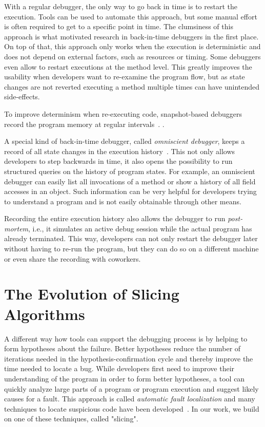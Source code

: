 With a regular debugger, the only way to go back in time is to restart the execution.
Tools can be used to automate this approach, but some manual effort is often required to get to a specific point in time.
The clumsiness of this approach is what motivated research in back-in-time debuggers in the first place.
On top of that, this approach only works when the execution is deterministic and does not depend on external factors, such as resources or timing.
Some debuggers even allow to restart executions at the method level.
This greatly improves the usability when developers want to re-examine the program flow, but as state changes are not reverted executing a method multiple times can have unintended side-effects.

To improve determinism when re-executing code, snapshot-based debuggers record the program memory at regular intervals~\cite{feldman88:igor_a_system}.
\cite{boothe00:efficient_algorithms_for_bidirectional}.

A special kind of back-in-time debugger, called \emph{omniscient debugger}, keeps a record of all state changes in the execution history~\cite{lewis03:debugging_backwards_in_time}.
This not only allows developers to step backwards in time, it also opens the possibility to run structured queries on the history of program states.
For example, an omniscient debugger can easily list all invocations of a method or show a history of all field accesses in an object.
Such information can be very helpful for developers trying to understand a program and is not easily obtainable through other means.

Recording the entire execution history also allows the debugger to run \emph{post-mortem}, i.e., it simulates an active debug session while the actual program has already terminated.
This way, developers can not only restart the debugger later without having to re-run the program, but they can do so on a different machine or even share the recording with coworkers.


\section{The Evolution of Slicing Algorithms}

A different way how tools can support the debugging process is by helping to form hypotheses about the failure.
Better hypotheses reduce the number of iterations needed in the hypothesis-confirmation cycle and thereby improve the time needed to locate a bug.
While developers first need to improve their understanding of the program in order to form better hypotheses, a tool can quickly analyze large parts of a program or program execution and suggest likely causes for a fault.
This approach is called \emph{automatic fault localization} and many techniques to locate suspicious code have been developed~\cite{wong16:a_survey_on_software}.
In our work, we build on one of these techniques, called "slicing".

